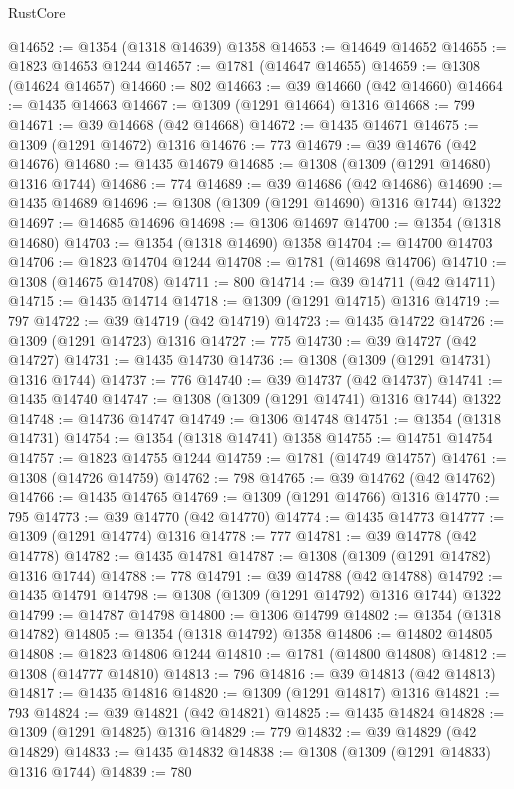 \begin{lexlean}{RustCore}
\begin{coremodule}
@14652 := @1354 (@1318 @14639) @1358
@14653 := @14649 @14652
@14655 := @1823 @14653 @1244
@14657 := @1781 (@14647 @14655)
@14659 := @1308 (@14624 @14657)
@14660 := 802
@14663 := @39 @14660 (@42 @14660)
@14664 := @1435 @14663
@14667 := @1309 (@1291 @14664) @1316
@14668 := 799
@14671 := @39 @14668 (@42 @14668)
@14672 := @1435 @14671
@14675 := @1309 (@1291 @14672) @1316
@14676 := 773
@14679 := @39 @14676 (@42 @14676)
@14680 := @1435 @14679
@14685 := @1308 (@1309 (@1291 @14680) @1316 @1744)
@14686 := 774
@14689 := @39 @14686 (@42 @14686)
@14690 := @1435 @14689
@14696 := @1308 (@1309 (@1291 @14690) @1316 @1744) @1322
@14697 := @14685 @14696
@14698 := @1306 @14697
@14700 := @1354 (@1318 @14680)
@14703 := @1354 (@1318 @14690) @1358
@14704 := @14700 @14703
@14706 := @1823 @14704 @1244
@14708 := @1781 (@14698 @14706)
@14710 := @1308 (@14675 @14708)
@14711 := 800
@14714 := @39 @14711 (@42 @14711)
@14715 := @1435 @14714
@14718 := @1309 (@1291 @14715) @1316
@14719 := 797
@14722 := @39 @14719 (@42 @14719)
@14723 := @1435 @14722
@14726 := @1309 (@1291 @14723) @1316
@14727 := 775
@14730 := @39 @14727 (@42 @14727)
@14731 := @1435 @14730
@14736 := @1308 (@1309 (@1291 @14731) @1316 @1744)
@14737 := 776
@14740 := @39 @14737 (@42 @14737)
@14741 := @1435 @14740
@14747 := @1308 (@1309 (@1291 @14741) @1316 @1744) @1322
@14748 := @14736 @14747
@14749 := @1306 @14748
@14751 := @1354 (@1318 @14731)
@14754 := @1354 (@1318 @14741) @1358
@14755 := @14751 @14754
@14757 := @1823 @14755 @1244
@14759 := @1781 (@14749 @14757)
@14761 := @1308 (@14726 @14759)
@14762 := 798
@14765 := @39 @14762 (@42 @14762)
@14766 := @1435 @14765
@14769 := @1309 (@1291 @14766) @1316
@14770 := 795
@14773 := @39 @14770 (@42 @14770)
@14774 := @1435 @14773
@14777 := @1309 (@1291 @14774) @1316
@14778 := 777
@14781 := @39 @14778 (@42 @14778)
@14782 := @1435 @14781
@14787 := @1308 (@1309 (@1291 @14782) @1316 @1744)
@14788 := 778
@14791 := @39 @14788 (@42 @14788)
@14792 := @1435 @14791
@14798 := @1308 (@1309 (@1291 @14792) @1316 @1744) @1322
@14799 := @14787 @14798
@14800 := @1306 @14799
@14802 := @1354 (@1318 @14782)
@14805 := @1354 (@1318 @14792) @1358
@14806 := @14802 @14805
@14808 := @1823 @14806 @1244
@14810 := @1781 (@14800 @14808)
@14812 := @1308 (@14777 @14810)
@14813 := 796
@14816 := @39 @14813 (@42 @14813)
@14817 := @1435 @14816
@14820 := @1309 (@1291 @14817) @1316
@14821 := 793
@14824 := @39 @14821 (@42 @14821)
@14825 := @1435 @14824
@14828 := @1309 (@1291 @14825) @1316
@14829 := 779
@14832 := @39 @14829 (@42 @14829)
@14833 := @1435 @14832
@14838 := @1308 (@1309 (@1291 @14833) @1316 @1744)
@14839 := 780

\end{coremodule}
\end{lexlean}
